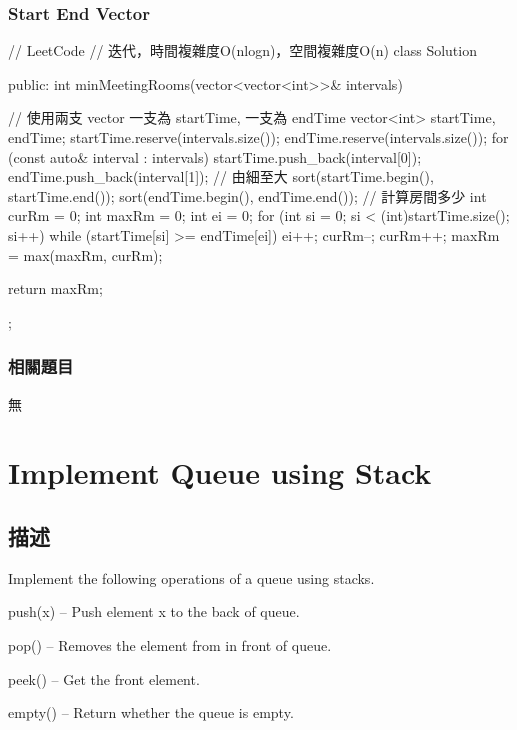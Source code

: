 \subsubsection{Start End Vector}
\begin{Code}
// LeetCode
// 迭代，時間複雜度O(nlogn)，空間複雜度O(n)
class Solution {
public:
    int minMeetingRooms(vector<vector<int>>& intervals) {
        // 使用兩支 vector 一支為 startTime, 一支為 endTime
        vector<int> startTime, endTime;
        startTime.reserve(intervals.size());
        endTime.reserve(intervals.size());
        for (const auto& interval : intervals)
        {
            startTime.push_back(interval[0]);
            endTime.push_back(interval[1]);
        }
        // 由細至大
        sort(startTime.begin(), startTime.end());
        sort(endTime.begin(), endTime.end());
        // 計算房間多少
        int curRm = 0;
        int maxRm = 0;
        int ei = 0;
        for (int si = 0; si < (int)startTime.size(); si++)
        {
            while (startTime[si] >= endTime[ei])
            {
                ei++;
                curRm--;
            }
            curRm++;
            maxRm = max(maxRm, curRm);
        }

        return maxRm;
    }
};
\end{Code}

\subsubsection{相關題目}
\begindot
\item 無
\myenddot

\section{Implement Queue using Stack}
\label{sec:implement-queue-using-stack}

\subsection{描述}
Implement the following operations of a queue using stacks.

\begindot
\item push(x) -- Push element x to the back of queue.
\item pop() -- Removes the element from in front of queue.
\item peek() -- Get the front element.
\item empty() -- Return whether the queue is empty.
\myenddot

